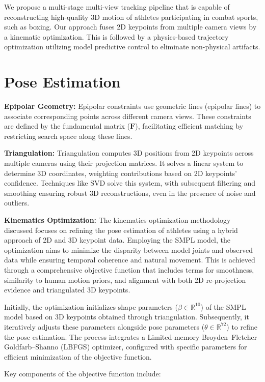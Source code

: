 We propose a multi-stage multi-view tracking pipeline that is capable of reconstructing high-quality 3D motion of athletes participating in combat sports, such as boxing. Our approach fuses 2D keypoints from multiple camera views by a kinematic optimization.  This is followed by a physics-based trajectory optimization utilizing model predictive control to eliminate non-physical artifacts. 

\section{Pose Estimation}
\textbf{Epipolar Geometry:} Epipolar constraints use geometric lines (epipolar lines) to associate corresponding points across different camera views. These constraints are defined by the fundamental matrix ($\mathbf{F}$), facilitating efficient matching by restricting search space along these lines.

\textbf{Triangulation:} Triangulation computes 3D positions from 2D keypoints across multiple cameras using their projection matrices. It solves a linear system to determine 3D coordinates, weighting contributions based on 2D keypoints’ confidence. Techniques like SVD solve this system, with subsequent filtering and smoothing ensuring robust 3D reconstructions, even in the presence of noise and outliers.

\textbf{Kinematics Optimization:} The kinematics optimization methodology discussed focuses on refining the pose estimation of athletes using a hybrid approach of 2D and 3D keypoint data. Employing the SMPL model, the optimization aims to minimize the disparity between model joints and observed data while ensuring temporal coherence and natural movement. This is achieved through a comprehensive objective function that includes terms for smoothness, similarity to human motion priors, and alignment with both 2D re-projection evidence and triangulated 3D keypoints.

Initially, the optimization initializes shape parameters ($\beta \in \mathbb{R}^{10}$) of the SMPL model based on 3D keypoints obtained through triangulation. Subsequently, it iteratively adjusts these parameters alongside pose parameters ($\theta \in \mathbb{R}^{72}$) to refine the pose estimation. The process integrates a Limited-memory Broyden–Fletcher–Goldfarb–Shanno (LBFGS) optimizer, configured with specific parameters for efficient minimization of the objective function.

Key components of the objective function include:

